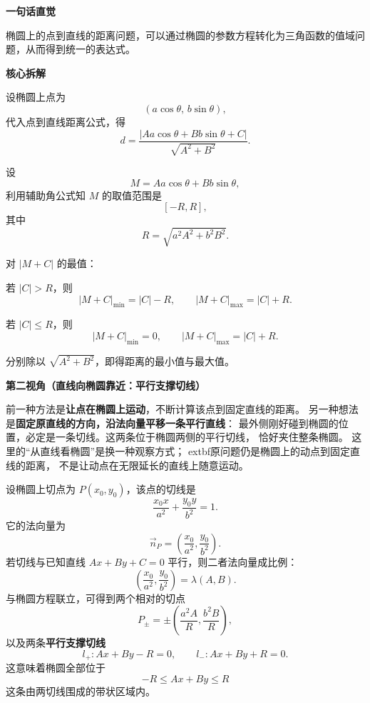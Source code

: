 \begin{explanationbox}
	\textbf{\textcolor{CExplanation}{一句话直觉}}

	椭圆上的点到直线的距离问题，可以通过椭圆的参数方程转化为三角函数的值域问题，从而得到统一的表达式。

	\medskip

	\textbf{\textcolor{CExplanation}{核心拆解}}

	\begin{description}[style=nextline, leftmargin=2.8em, labelsep=0.5em, itemsep=0.45em]
		\item[\textbf{要点一（参数化转化）：}]
		      设椭圆上点为
		      \[
			      (a\cos\theta,\,b\sin\theta),
		      \]
		      代入点到直线距离公式，得
		      \[
			      d=
			      \frac{|Aa\cos\theta+Bb\sin\theta+C|}{\sqrt{A^2+B^2}}.
		      \]

		\item[\textbf{要点二（三角辅助角）：}]
		      设
		      \[
			      M=Aa\cos\theta+Bb\sin\theta,
		      \]
		      利用辅助角公式知 \(M\) 的取值范围是
		      \[
			      [-R,R],
		      \]
		      其中
		      \[
			      R=\sqrt{a^2A^2+b^2B^2}.
		      \]

		\item[\textbf{要点三（分情况讨论）：}]
		      对 \(|M+C|\) 的最值：

		      若 \(|C|>R\)，则
		      \[
			      |M+C|_{\min}=|C|-R,\qquad |M+C|_{\max}=|C|+R.
		      \]

		      若 \(|C|\le R\)，则
		      \[
			      |M+C|_{\min}=0,\qquad |M+C|_{\max}=|C|+R.
		      \]

		      分别除以 \(\sqrt{A^2+B^2}\)，即得距离的最小值与最大值。
	\end{description}

	\medskip

	\textbf{\textcolor{CExplanation}{第二视角（直线向椭圆靠近：平行支撑切线）}}

	前一种方法是\textbf{让点在椭圆上运动}，不断计算该点到固定直线的距离。
	另一种想法是\textbf{固定原直线的方向，沿法向量平移一条平行直线}：
	最外侧刚好碰到椭圆的位置，必定是一条切线。这两条位于椭圆两侧的平行切线，
	恰好夹住整条椭圆。
	这里的“从直线看椭圆”是换一种观察方式；	extbf{原问题仍是椭圆上的动点到固定直线的距离}，
	不是让动点在无限延长的直线上随意运动。

	设椭圆上切点为 \(P(x_0,y_0)\)，该点的切线是
	\[
		\frac{x_0x}{a^2}+\frac{y_0y}{b^2}=1.
	\]
	它的法向量为
	\[
		\vec n_P=\left(\frac{x_0}{a^2},\frac{y_0}{b^2}\right).
	\]
	若切线与已知直线 \(Ax+By+C=0\) 平行，则二者法向量成比例：
	\[
		\left(\frac{x_0}{a^2},\frac{y_0}{b^2}\right)
		=\lambda(A,B).
	\]
	与椭圆方程联立，可得到两个相对的切点
	\[
		P_\pm=\pm\left(\frac{a^2A}{R},\frac{b^2B}{R}\right),
	\]
	以及两条\textbf{平行支撑切线}
	\[
		l_+:Ax+By-R=0,\qquad l_-:Ax+By+R=0.
	\]
	这意味着椭圆全部位于
	\[
		-R\le Ax+By\le R
	\]
	这条由两切线围成的带状区域内。


\end{explanationbox}
